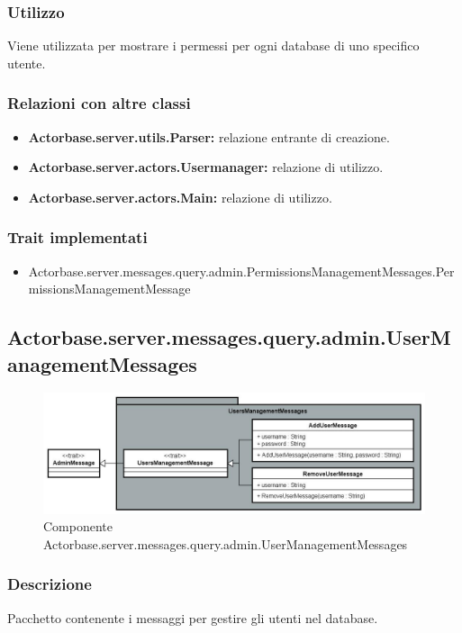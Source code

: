 \documentclass[a4paper]{article}
\begin{document}
			\subsubsection{Utilizzo}
				Viene utilizzata per mostrare i  permessi per ogni database di uno specifico utente.
				
			\subsubsection{Relazioni con altre classi}
				\begin{itemize}
					\item \textbf{Actorbase.server.utils.Parser:} relazione entrante di creazione.
					\item \textbf{Actorbase.server.actors.Usermanager:} relazione di utilizzo.
					\item \textbf{Actorbase.server.actors.Main:} relazione di utilizzo.
				\end{itemize}
			\subsubsection{Trait implementati}
				\begin{itemize}
					\item Actorbase.server.messages.query.admin.PermissionsManagementMessages.PermissionsManagementMessage
				\end{itemize}
				
		\subsection{Actorbase.server.messages.query.admin.UserManagementMessages}
		
			\begin{figure}[H]
				\centering
				\includegraphics[width=\textwidth]{ST/Server/userManagementLevel.jpg}
				\caption{Componente Actorbase.server.messages.query.admin.UserManagementMessages}
			\end{figure}
			
			\subsubsection{Descrizione}
				Pacchetto contenente i messaggi per gestire gli utenti nel database.
				
\end{document}
